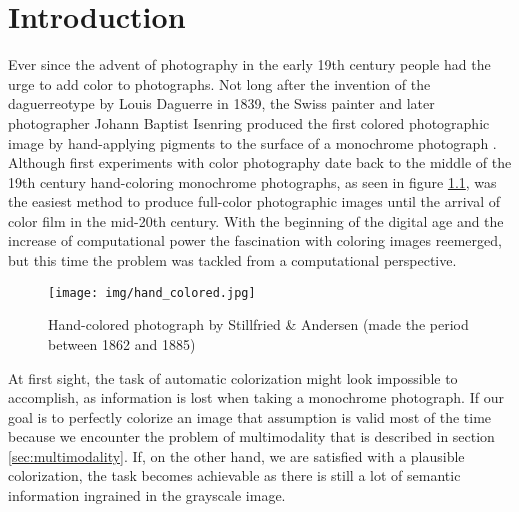\chapter{Introduction}
\label{ch:introduction}
\begin{comment}
    The introduction to the thesis

    Colorization definition

    Topics to cover:
        What is image colorization
        Why is it useful
        What can it be used for
        Description of the task

        Not sure about previous work, if there is enough text, it might be its own chapter
\end{comment}

Ever since the advent of photography in the early 19th century people had
the urge to add color to photographs. Not long after the invention of the 
daguerreotype by Louis Daguerre in 1839, the Swiss painter and later photographer 
Johann Baptist Isenring produced the first colored photographic image by 
hand-applying pigments to the surface of a monochrome photograph \citep{henisch1996photograph}. 
Although first experiments with color photography date back to the middle of the 19th 
century hand-coloring monochrome photographs, as seen in figure \ref{fig:hand_colored}, 
was the easiest method to produce full-color photographic images until the arrival 
of color film in the mid-20th century. With the beginning of the digital age and 
the increase of computational power the fascination with coloring images reemerged, 
but this time the problem was tackled from a computational perspective.

\begin{figure}[H]
    \centering
    \texttt{[image: img/hand\_colored.jpg]}
    \caption{Hand-colored photograph by Stillfried \& Andersen (made the period between 1862 and 1885)}
    \label{fig:hand_colored}
\end{figure}

At first sight, the task of automatic colorization might look impossible to accomplish, 
as information is lost when taking a monochrome photograph. If our goal is to 
perfectly colorize an image that assumption is valid most of the time because we 
encounter the problem of multimodality that is described in section 
\ref{sec:multimodality}. If, on the other hand, we are satisfied with a plausible 
colorization, the task becomes achievable as there is still a lot of semantic 
information ingrained in the grayscale image. 

